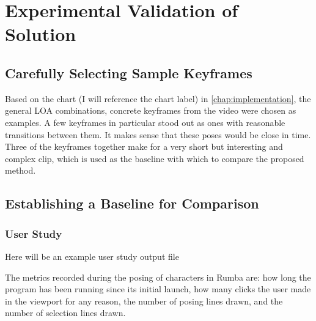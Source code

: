 \chapter{Experimental Validation of Solution}\label{chap:results}

\section{Carefully Selecting Sample Keyframes}
Based on the chart (I will reference the chart label) in \autoref{chap:implementation}, the general LOA combinations, concrete keyframes from the video were chosen as examples. A few keyframes in particular stood out as ones with reasonable transitions between them. It makes sense that these poses would be close in time. Three of the keyframes together make for a very short but interesting and complex clip, which is used as the baseline with which to compare the proposed method.

\section{Establishing a Baseline for Comparison}
\subsection{User Study}


\begin{displayquote}
 Here will be an example user study output file
\end{displayquote}

The metrics recorded during the posing of characters in Rumba are: how long the program has been running since its initial launch, how many clicks the user made in the viewport for any reason, the number of posing lines drawn, and the number of selection lines drawn.

